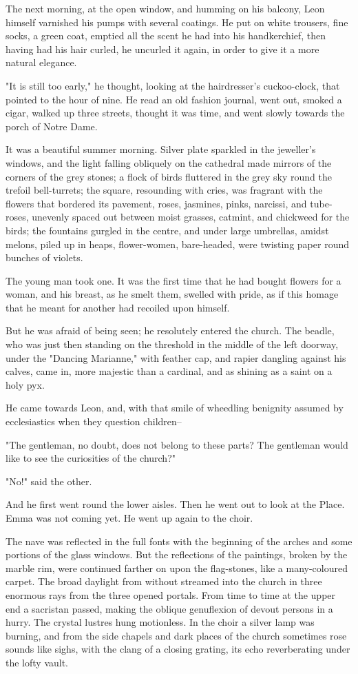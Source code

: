 \documentclass{tufte-book}
\begin{document}
The next morning, at the open window, and humming on his balcony, Leon
himself varnished his pumps with several coatings. He put on white
trousers, fine socks, a green coat, emptied all the scent he had into
his handkerchief, then having had his hair curled, he uncurled it again,
in order to give it a more natural elegance.

"It is still too early," he thought, looking at the hairdresser's
cuckoo-clock, that pointed to the hour of nine. He read an old fashion
journal, went out, smoked a cigar, walked up three streets, thought it
was time, and went slowly towards the porch of Notre Dame.

It was a beautiful summer morning. Silver plate sparkled in the
jeweller's windows, and the light falling obliquely on the cathedral
made mirrors of the corners of the grey stones; a flock of birds
fluttered in the grey sky round the trefoil bell-turrets; the square,
resounding with cries, was fragrant with the flowers that bordered its
pavement, roses, jasmines, pinks, narcissi, and tube-roses, unevenly
spaced out between moist grasses, catmint, and chickweed for the birds;
the fountains gurgled in the centre, and under large umbrellas, amidst
melons, piled up in heaps, flower-women, bare-headed, were twisting
paper round bunches of violets.

The young man took one. It was the first time that he had bought flowers
for a woman, and his breast, as he smelt them, swelled with pride, as if
this homage that he meant for another had recoiled upon himself.

But he was afraid of being seen; he resolutely entered the church. The
beadle, who was just then standing on the threshold in the middle of the
left doorway, under the "Dancing Marianne," with feather cap, and rapier
dangling against his calves, came in, more majestic than a cardinal, and
as shining as a saint on a holy pyx.

He came towards Leon, and, with that smile of wheedling benignity
assumed by ecclesiastics when they question children--

"The gentleman, no doubt, does not belong to these parts? The gentleman
would like to see the curiosities of the church?"

"No!" said the other.

And he first went round the lower aisles. Then he went out to look at
the Place. Emma was not coming yet. He went up again to the choir.

The nave was reflected in the full fonts with the beginning of the
arches and some portions of the glass windows. But the reflections of
the paintings, broken by the marble rim, were continued farther on upon
the flag-stones, like a many-coloured carpet. The broad daylight from
without streamed into the church in three enormous rays from the three
opened portals. From time to time at the upper end a sacristan passed,
making the oblique genuflexion of devout persons in a hurry. The crystal
lustres hung motionless. In the choir a silver lamp was burning, and
from the side chapels and dark places of the church sometimes rose
sounds like sighs, with the clang of a closing grating, its echo
reverberating under the lofty vault.
\end{document}
